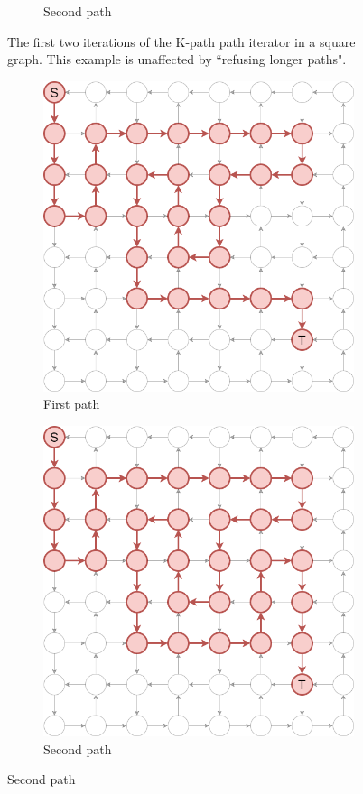 \documentclass[12pt, oneside]{report}
\theoremstyle{plain}
\theoremstyle{definition}
\theoremstyle{indented}
\begin{document}
\begin{appendices}
\begin{figure}[ht]
\begin{subfigure}{.5\textwidth}
  \caption{Second path}
\end{subfigure}
\caption{The first two iterations of the K-path path iterator in a square graph. This example is unaffected by ``refusing longer paths".}
\label{fig:pathexamples-kpath}
\end{figure}

\begin{figure}[ht]
\begin{subfigure}{.5\textwidth}
  \centering
\includegraphics[width=0.8\linewidth]{images/pathiterators/examples-DFS-1.png}
  \caption{First path}
\end{subfigure}
\begin{subfigure}{.5\textwidth}
  \centering
\includegraphics[width=0.8\linewidth]{images/pathiterators/examples-DFS-2.png}
  \caption{Second path}
\end{subfigure}


\end{figure}
\end{appendices}
\end{document}
